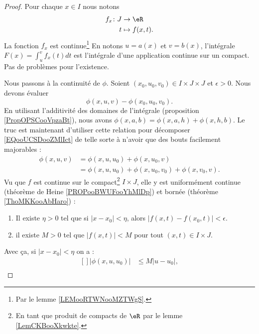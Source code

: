 \begin{proof}
	Pour chaque \( x\in I\) nous notons
	\begin{equation}
		\begin{aligned}
			f_x\colon J & \to \eR         \\
			t           & \mapsto f(x,t).
		\end{aligned}
	\end{equation}
	La fonction \( f_x\) est continue\footnote{Par le lemme \ref{LEMooRTWNooMZTWgS}.} En notons \( u=a(x)\) et \( v=b(x)\), l'intégrale \( F(x)=\int_u^vf_x(t)dt\) est l'intégrale d'une application continue sur un compact. Pas de problèmes pour l'existence.

	Nous passons à la continuité de \( \phi\). Soient \( (x_0,u_0,v_0)\in I\times J\times J\) et \( \epsilon>0\). Nous devons évaluer
	\begin{equation}		\label{EQooUCSDooZMlIct}
		\phi(x,u,v)-\phi(x_0,u_0,v_0).
	\end{equation}
	En utilisant l'additivité des domaines de l'intégrale (proposition \ref{PropOPSCooVpzaBt}), nous avons \( \phi(x,a,b)=\phi(x,a,h)+\phi(x,h,b)\). Le truc est maintenant d'utiliser cette relation pour décomposer \eqref{EQooUCSDooZMlIct} de telle sorte à n'avoir que des bouts facilement majorables :
	\begin{subequations}		\label{EQooXKAMooJQqhYZ}
		\begin{align}
			\phi(x,u,v) & =\phi(x,u,u_0)+\phi(x,u_0,v)                  \\
			            & =\phi(x,u,u_0)+\phi(x,u_0,v_0)+\phi(x,v_0,v).
		\end{align}
	\end{subequations}
	Vu que \( f\) est continue sur le compact\footnote{En tant que produit de compacts de \( \eR\) par le lemme \ref{LemCKBooXkwkte}.} \( I\times J\), elle y est uniformément continue (théorème de Heine \ref{PROPooBWUFooYhMlDp}) et bornée (théorème \ref{ThoMKKooAbHaro}) :
	\begin{enumerate}
		\item
		      Il existe \( \eta>0\) tel que si \( | x-x_0 |<\eta\), alors \( | f(x,t)-f(x_0,t) |<\epsilon\).
		\item
		      il existe \( M>0\) tel que \( | f(x,t) |<M\) pour tout \( (x,t)\in I\times J\).
	\end{enumerate}
	Avec ça, si \( | x-x_0 |<\eta\) on a :
	\begin{equation}
		\begin{aligned}[]
			| \phi(x,u,u_0) | & \leq M| u-u_0 |, \\

\end{aligned}
\end{equation}
\end{proof}
